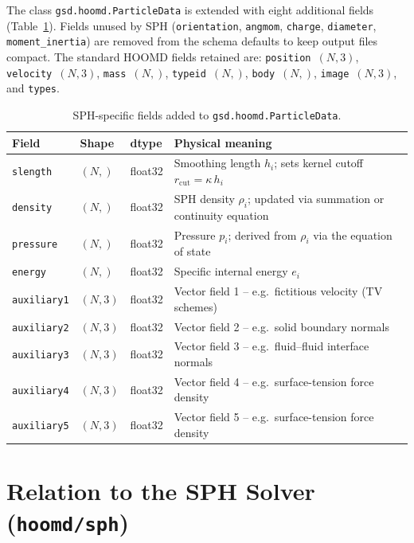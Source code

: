 \documentclass[10pt,a4paper]{article}
\begin{document}
The class \texttt{gsd.hoomd.ParticleData} is extended with eight additional
fields (Table~\ref{tab:fields}).  Fields unused by SPH (\texttt{orientation},
\texttt{angmom}, \texttt{charge}, \texttt{diameter}, \texttt{moment\_inertia})
are removed from the schema defaults to keep output files compact.
The standard HOOMD fields retained are: \texttt{position}~$(N,3)$,
\texttt{velocity}~$(N,3)$, \texttt{mass}~$(N,)$, \texttt{typeid}~$(N,)$,
\texttt{body}~$(N,)$, \texttt{image}~$(N,3)$, and \texttt{types}.

\begin{table}[h]
\centering
\caption{SPH-specific fields added to \texttt{gsd.hoomd.ParticleData}.}
\label{tab:fields}
\small
\begin{tabular}{@{}lllp{7.5cm}@{}}
\toprule
\textbf{Field} & \textbf{Shape} & \textbf{dtype} & \textbf{Physical meaning}\\
\midrule
\texttt{slength}    & $(N,)$   & float32 & Smoothing length $h_i$; sets kernel cutoff $r_\mathrm{cut} = \kappa\,h_i$\\
\texttt{density}    & $(N,)$   & float32 & SPH density $\rho_i$; updated via summation or continuity equation\\
\texttt{pressure}   & $(N,)$   & float32 & Pressure $p_i$; derived from $\rho_i$ via the equation of state\\
\texttt{energy}     & $(N,)$   & float32 & Specific internal energy $e_i$\\
\texttt{auxiliary1} & $(N, 3)$ & float32 & Vector field 1 -- e.g.\ fictitious velocity (TV schemes)\\
\texttt{auxiliary2} & $(N, 3)$ & float32 & Vector field 2 -- e.g.\ solid boundary normals\\
\texttt{auxiliary3} & $(N, 3)$ & float32 & Vector field 3 -- e.g.\ fluid--fluid interface normals\\
\texttt{auxiliary4} & $(N, 3)$ & float32 & Vector field 4 -- e.g.\ surface-tension force density\\
\texttt{auxiliary5} & $(N, 3)$ & float32 & Vector field 5 -- e.g.\ surface-tension force density\\
\bottomrule
\end{tabular}
\end{table}

\section{Relation to the SPH Solver (\texttt{hoomd/sph})}
\end{document}
